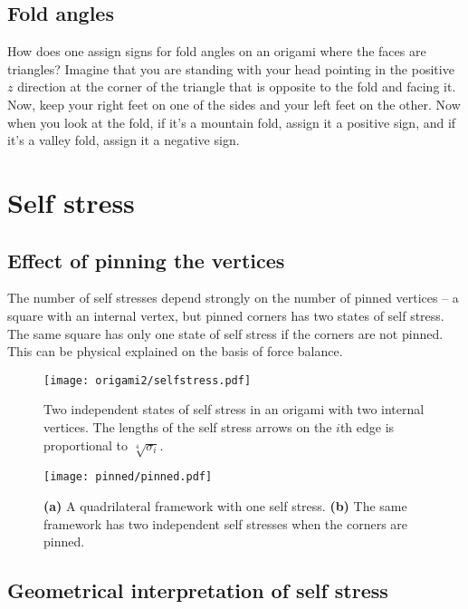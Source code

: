 \subsection{Fold angles}

How does one assign signs for fold angles on an origami where the faces are triangles?
Imagine that you are standing with your head pointing in the positive $z$ direction at the corner of the triangle that is opposite to the fold and facing it.
Now, keep your right feet on one of the sides and your left feet on the other.
Now when you look at the fold, if it's a mountain fold, assign it a positive sign, and if it's a valley fold, assign it a negative sign.

\section{Self stress}

\subsection{Effect of pinning the vertices}

The number of self stresses depend strongly on the number of pinned vertices -- a square with an internal vertex, but pinned corners has two states of self stress.  The same square has only one state of self stress if the corners are not pinned.
This can be physical explained on the basis of force balance.

\begin{figure}
  \begin{center}
    \texttt{[image: origami2/selfstress.pdf]}
  \end{center}
  \caption{
    Two independent states of self stress in an origami with two internal vertices.
    The lengths of the self stress arrows on the $i$th edge is proportional to $\sqrt[4]{\sigma_{i}}$.
  }
  \label{fig:origami2_selfstress}
\end{figure}
%
\begin{figure}
  \begin{center}
    \texttt{[image: pinned/pinned.pdf]}
  \end{center}
  \caption{
    \textsf{\textbf{(a)}} A quadrilateral framework with one self stress.
    \textsf{\textbf{(b)}} The same framework has two independent self stresses when the corners are pinned.
  }
  \label{fig:origami2_selfstress}
\end{figure}


\subsection{Geometrical interpretation of self stress}

